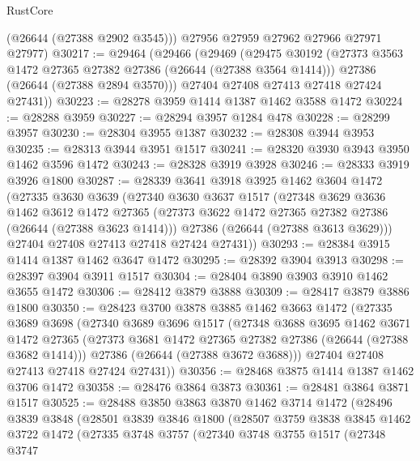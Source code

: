 \begin{lexlean}{RustCore}
\begin{coremodule}
        (@26644 (@27388 @2902 @3545)))
      @27956
      @27959
      @27962
      @27966
      @27971
      @27977)
@30217 := @29464
    (@29466
      (@29469
        (@29475
          @30192
          (@27373 @3563 @1472 @27365 @27382 @27386 (@26644 (@27388 @3564 @1414)))
          @27386
          (@26644 (@27388 @2894 @3570)))
        @27404
        @27408
        @27413
        @27418
        @27424
        @27431))
@30223 := @28278 @3959 @1414 @1387 @1462 @3588 @1472
@30224 := @28288 @3959
@30227 := @28294 @3957 @1284 @478
@30228 := @28299 @3957
@30230 := @28304 @3955 @1387
@30232 := @28308 @3944 @3953
@30235 := @28313 @3944 @3951 @1517
@30241 := @28320 @3930 @3943 @3950 @1462 @3596 @1472
@30243 := @28328 @3919 @3928
@30246 := @28333 @3919 @3926 @1800
@30287 := @28339
    @3641
    @3918
    @3925
    @1462
    @3604
    @1472
    (@27335
      @3630
      @3639
      (@27340
        @3630
        @3637
        @1517
        (@27348
          @3629
          @3636
          @1462
          @3612
          @1472
          @27365
          (@27373 @3622 @1472 @27365 @27382 @27386 (@26644 (@27388 @3623 @1414)))
          @27386
          (@26644 (@27388 @3613 @3629)))
        @27404
        @27408
        @27413
        @27418
        @27424
        @27431))
@30293 := @28384 @3915 @1414 @1387 @1462 @3647 @1472
@30295 := @28392 @3904 @3913
@30298 := @28397 @3904 @3911 @1517
@30304 := @28404 @3890 @3903 @3910 @1462 @3655 @1472
@30306 := @28412 @3879 @3888
@30309 := @28417 @3879 @3886 @1800
@30350 := @28423
    @3700
    @3878
    @3885
    @1462
    @3663
    @1472
    (@27335
      @3689
      @3698
      (@27340
        @3689
        @3696
        @1517
        (@27348
          @3688
          @3695
          @1462
          @3671
          @1472
          @27365
          (@27373 @3681 @1472 @27365 @27382 @27386 (@26644 (@27388 @3682 @1414)))
          @27386
          (@26644 (@27388 @3672 @3688)))
        @27404
        @27408
        @27413
        @27418
        @27424
        @27431))
@30356 := @28468 @3875 @1414 @1387 @1462 @3706 @1472
@30358 := @28476 @3864 @3873
@30361 := @28481 @3864 @3871 @1517
@30525 := @28488
    @3850
    @3863
    @3870
    @1462
    @3714
    @1472
    (@28496
      @3839
      @3848
      (@28501
        @3839
        @3846
        @1800
        (@28507
          @3759
          @3838
          @3845
          @1462
          @3722
          @1472
          (@27335
            @3748
            @3757
            (@27340
              @3748
              @3755
              @1517
              (@27348
                @3747

\end{coremodule}
\end{lexlean}
